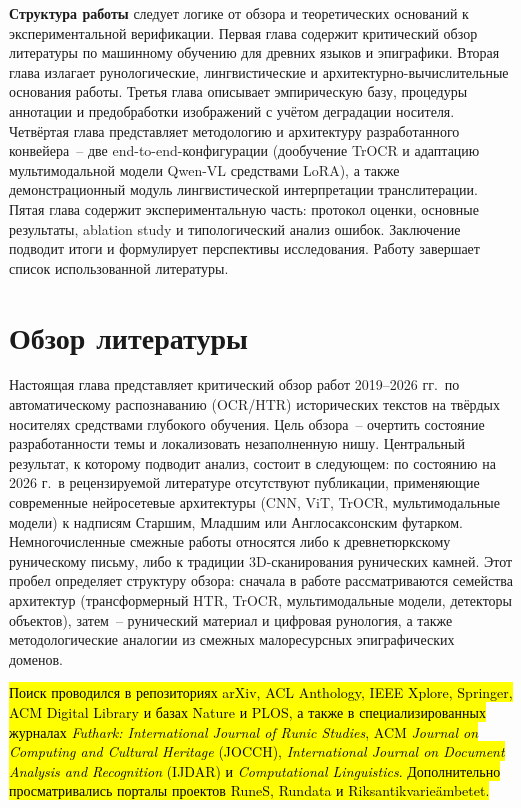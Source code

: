 \documentclass[a4paper,12pt]{extarticle}
\begin{document}
\textbf{Структура работы} следует логике от обзора и теоретических оснований к экспериментальной верификации. Первая глава содержит критический обзор литературы по машинному обучению для древних языков и эпиграфики. Вторая глава излагает рунологические, лингвистические и архитектурно-вычислительные основания работы. Третья глава описывает эмпирическую базу, процедуры аннотации и предобработки изображений с учётом деградации носителя. Четвёртая глава представляет методологию и архитектуру разработанного
конвейера~-- две end-to-end-конфигурации (дообучение TrOCR и адаптацию
мультимодальной модели Qwen-VL средствами LoRA), а также демонстрационный
модуль лингвистической интерпретации транслитерации. Пятая глава содержит экспериментальную часть: протокол оценки, основные результаты, ablation study и типологический анализ ошибок. Заключение подводит итоги и формулирует перспективы исследования. Работу завершает список использованной литературы.




\section{Обзор литературы}
\label{sec:litreview}

Настоящая глава представляет критический обзор работ 2019--2026 гг.\ по автоматическому распознаванию (OCR/HTR) исторических текстов на твёрдых носителях средствами глубокого обучения. Цель обзора~-- очертить состояние разработанности темы и локализовать незаполненную нишу. Центральный результат, к которому подводит анализ, состоит в следующем: по состоянию на 2026 г.\ в рецензируемой литературе отсутствуют публикации, применяющие современные нейросетевые архитектуры (CNN, ViT, TrOCR, мультимодальные модели) к надписям Старшим, Младшим или Англосаксонским футарком. Немногочисленные смежные работы относятся либо к древнетюркскому руническому письму, либо к традиции 3D-сканирования рунических камней. Этот пробел определяет структуру обзора: сначала в работе рассматриваются семейства архитектур (трансформерный HTR, TrOCR, мультимодальные модели, детекторы объектов), затем~-- рунический материал и цифровая рунология, а также методологические аналогии из смежных малоресурсных эпиграфических доменов.

\hl{Поиск проводился в репозиториях arXiv, ACL Anthology, IEEE Xplore, Springer, ACM Digital Library и базах Nature и PLOS, а также в специализированных журналах \textit{Futhark: International Journal of Runic Studies}, ACM \textit{Journal on Computing and Cultural Heritage} (JOCCH), \textit{International Journal on Document Analysis and Recognition} (IJDAR) и \textit{Computational Linguistics}. Дополнительно просматривались порталы проектов RuneS, Rundata и Riksantikvarieämbetet.}
\end{document}
